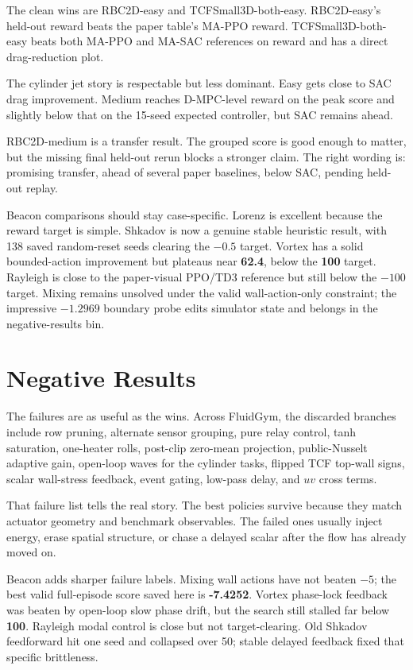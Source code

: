 \documentclass[10pt]{article}
\newcommand{\score}[1]{\textbf{#1}}
\begin{document}
The clean wins are RBC2D-easy and TCFSmall3D-both-easy. RBC2D-easy's held-out reward beats the paper table's MA-PPO reward. TCFSmall3D-both-easy beats both MA-PPO and MA-SAC references on reward and has a direct drag-reduction plot.

The cylinder jet story is respectable but less dominant. Easy gets close to SAC drag improvement. Medium reaches D-MPC-level reward on the peak score and slightly below that on the 15-seed expected controller, but SAC remains ahead.

RBC2D-medium is a transfer result. The grouped score is good enough to matter, but the missing final held-out rerun blocks a stronger claim. The right wording is: promising transfer, ahead of several paper baselines, below SAC, pending held-out replay.

Beacon comparisons should stay case-specific. Lorenz is excellent because the reward target is simple. Shkadov is now a genuine stable heuristic result, with 138 saved random-reset seeds clearing the \(-0.5\) target. Vortex has a solid bounded-action improvement but plateaus near \score{62.4}, below the \score{100} target. Rayleigh is close to the paper-visual PPO/TD3 reference but still below the \(-100\) target. Mixing remains unsolved under the valid wall-action-only constraint; the impressive \(-1.2969\) boundary probe edits simulator state and belongs in the negative-results bin.

\section{Negative Results}

The failures are as useful as the wins. Across FluidGym, the discarded branches include row pruning, alternate sensor grouping, pure relay control, tanh saturation, one-heater rolls, post-clip zero-mean projection, public-Nusselt adaptive gain, open-loop waves for the cylinder tasks, flipped TCF top-wall signs, scalar wall-stress feedback, event gating, low-pass delay, and \(u v\) cross terms.

That failure list tells the real story. The best policies survive because they match actuator geometry and benchmark observables. The failed ones usually inject energy, erase spatial structure, or chase a delayed scalar after the flow has already moved on.

Beacon adds sharper failure labels. Mixing wall actions have not beaten \(-5\); the best valid full-episode score saved here is \score{-7.4252}. Vortex phase-lock feedback was beaten by open-loop slow phase drift, but the search still stalled far below \score{100}. Rayleigh modal control is close but not target-clearing. Old Shkadov feedforward hit one seed and collapsed over 50; stable delayed feedback fixed that specific brittleness.
\end{document}
